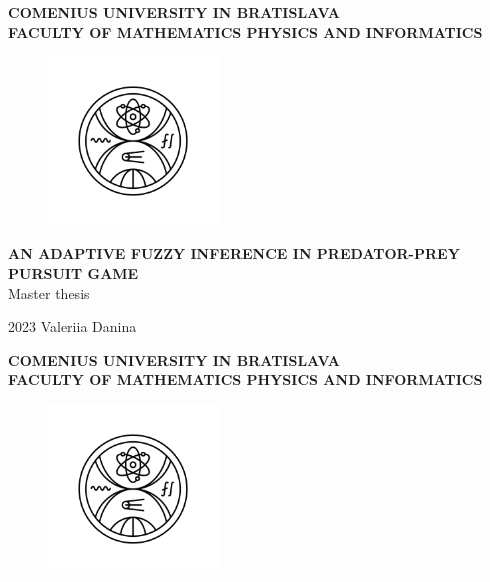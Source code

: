 \documentclass[12pt, twoside, openany]{book}
\def\mfrok{2023}
\def\mftitle{An adaptive fuzzy inference in predator-prey pursuit game}
\def\mfthesistype{Master thesis}
\def\mfauthor{Valeriia Danina}
\def\mfuniversity{COMENIUS UNIVERSITY IN BRATISLAVA}
\def\mffaculty{FACULTY OF MATHEMATICS PHYSICS AND INFORMATICS}
\begin{document}
\frontmatter


\thispagestyle{empty}

\noindent
\begin{minipage}{\textwidth}
    \begin{center}
        \textbf{\mfuniversity \\
        \mffaculty}
    \end{center}
\end{minipage}

\vfill
\begin{figure}[!hbt]
	\begin{center}
		\includegraphics[width=0.4\textwidth]{images/FMFI_logo_BP.png}
		\label{img:logo}
	\end{center}
\end{figure}
\begin{center}
		\textbf{\MakeUppercase{\Large\mftitle}}\\
		\mfthesistype
\end{center}
\vfill
\mfrok \hfill
\mfauthor
\cleardoublepage
\thispagestyle{empty}
\noindent
\begin{minipage}{\textwidth}
    \begin{center}
        \textbf{\mfuniversity \\
        \mffaculty}
    \end{center}
\end{minipage}

\vfill
\begin{figure}[!hbt]
    \begin{center}
        \includegraphics[width=0.4\textwidth]{images/FMFI_logo_BP.png}
        \label{img:logo_dark}
    \end{center}
\end{figure}
\end{document}
